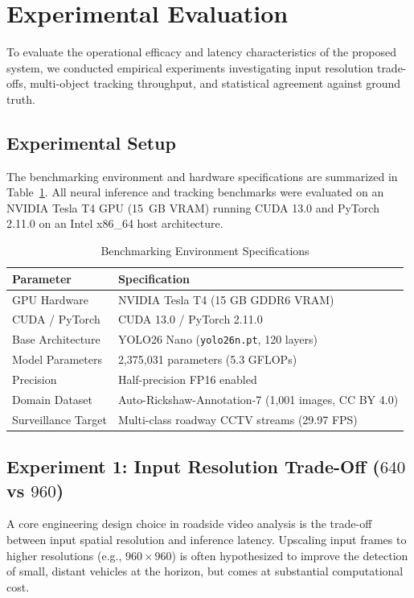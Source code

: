 \section{Experimental Evaluation}
\label{sec:evaluation}

To evaluate the operational efficacy and latency characteristics of the proposed system, we conducted empirical experiments investigating input resolution trade-offs, multi-object tracking throughput, and statistical agreement against ground truth.

\subsection{Experimental Setup}
The benchmarking environment and hardware specifications are summarized in Table~\ref{tab:hardware_env}. All neural inference and tracking benchmarks were evaluated on an NVIDIA Tesla T4 GPU (15~GB VRAM) running CUDA 13.0 and PyTorch 2.11.0 on an Intel x86\_64 host architecture.

\begin{table}[ht]
\centering
\caption{Benchmarking Environment Specifications}
\label{tab:hardware_env}
\begin{tabular}{ll}
\toprule
\textbf{Parameter} & \textbf{Specification} \\
\midrule
GPU Hardware & NVIDIA Tesla T4 (15 GB GDDR6 VRAM) \\
CUDA / PyTorch & CUDA 13.0 / PyTorch 2.11.0 \\
Base Architecture & YOLO26 Nano (\texttt{yolo26n.pt}, 120 layers) \\
Model Parameters & 2,375,031 parameters (5.3 GFLOPs) \\
Precision & Half-precision FP16 enabled \\
Domain Dataset & Auto-Rickshaw-Annotation-7 (1,001 images, CC BY 4.0) \\
Surveillance Target & Multi-class roadway CCTV streams (29.97 FPS) \\
\bottomrule
\end{tabular}
\end{table}

\subsection{Experiment 1: Input Resolution Trade-Off ($640$ vs $960$)}
A core engineering design choice in roadside video analysis is the trade-off between input spatial resolution and inference latency. Upscaling input frames to higher resolutions (e.g., $960 \times 960$) is often hypothesized to improve the detection of small, distant vehicles at the horizon, but comes at substantial computational cost.

